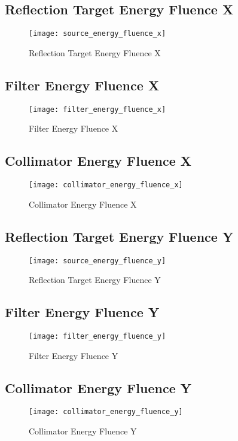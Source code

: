 \documentclass[12pt]{article}
\begin{document}
\subsection{Reflection Target Energy Fluence X}
\begin{figure}[H]
\centering
\texttt{[image: source\_energy\_fluence\_x]}
\caption{Reflection Target Energy Fluence X}
\label{fig:source_energy_fluence_x}
\end{figure}

\subsection{Filter Energy Fluence X}
\begin{figure}[H]
\centering
\texttt{[image: filter\_energy\_fluence\_x]}
\caption{Filter Energy Fluence X}
\label{fig:filter_energy_fluence_x}
\end{figure}

\subsection{Collimator Energy Fluence X}
\begin{figure}[H]
\centering
\texttt{[image: collimator\_energy\_fluence\_x]}
\caption{Collimator Energy Fluence X}
\label{fig:collimator_energy_fluence_x}
\end{figure}


\subsection{Reflection Target Energy Fluence Y}
\begin{figure}[H]
\centering
\texttt{[image: source\_energy\_fluence\_y]}
\caption{Reflection Target Energy Fluence Y}
\label{fig:source_energy_fluence_y}
\end{figure}

\subsection{Filter Energy Fluence Y}
\begin{figure}[H]
\centering
\texttt{[image: filter\_energy\_fluence\_y]}
\caption{Filter Energy Fluence Y}
\label{fig:filter_energy_fluence_y}
\end{figure}

\subsection{Collimator Energy Fluence Y}
\begin{figure}[H]
\centering
\texttt{[image: collimator\_energy\_fluence\_y]}
\caption{Collimator Energy Fluence Y}
\label{fig:collimator_energy_fluence_y}
\end{figure}
\end{document}
